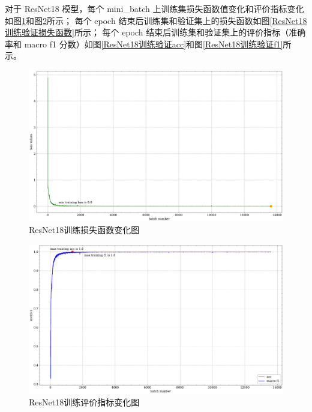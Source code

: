 \documentclass[supercite]{Experimental_Report}
\theoremstyle{definition}
\begin{document}
对于 ResNet18 模型，每个 mini\_batch 上训练集损失函数值变化和评价指标变化
如图\ref{ResNet18训练损失函数batch}和图\ref{ResNet18训练评价指标batch}所示；
每个 epoch 结束后训练集和验证集上的损失函数如图\ref{ResNet18训练验证损失函数}所示；
每个 epoch 结束后训练集和验证集上的评价指标（准确率和 macro f1 分数）如图\ref{ResNet18训练验证acc}和图\ref{ResNet18训练验证f1}所示。
\begin{figure}[H]
	\begin{center}
		\includegraphics[scale=0.45]{../images/ResNet18训练损失函数batch.pdf}
		\caption{ResNet18训练损失函数变化图}
		\label{ResNet18训练损失函数batch}
	\end{center}
\end{figure}
\begin{figure}[H]
	\begin{center}
		\includegraphics[scale=0.45]{../images/ResNet18训练评价指标batch.pdf}
		\caption{ResNet18训练评价指标变化图}
		\label{ResNet18训练评价指标batch}
	\end{center}
\end{figure}
\end{document}
